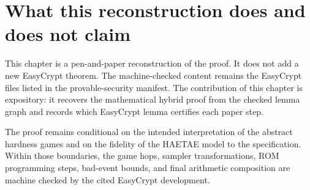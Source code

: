 \section{What this reconstruction does and does not claim}
\label{sec:paper-proof-scope}

This chapter is a pen-and-paper reconstruction of the proof.  It does not add a
new EasyCrypt theorem.  The machine-checked content remains the EasyCrypt files
listed in the provable-security manifest.  The contribution of this chapter is
expository: it recovers the mathematical hybrid proof from the checked lemma
graph and records which EasyCrypt lemma certifies each paper step.

The proof remains conditional on the intended interpretation of the abstract
hardness games and on the fidelity of the HAETAE model to the specification.
Within those boundaries, the game hops, sampler transformations, ROM
programming steps, bad-event bounds, and final arithmetic composition are
machine checked by the cited EasyCrypt development.

